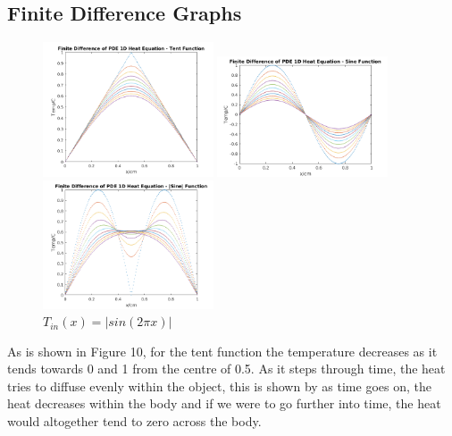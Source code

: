 \documentclass[11pt,a4paper]{article}
\begin{document}
\subsection{Finite Difference Graphs}

\begin{figure}
    \vspace{-13mm}
  		\includegraphics[width=0.45\textwidth]{Ex4_Figs/FiniteTent.png}
	\vspace{-4mm}
  	\caption{$T_{in}(x)= tent(x)$}
  		\includegraphics[width=0.45\textwidth]{Ex4_Figs/FiniteSine.png}
	\vspace{-4mm}
  	\caption{$T_{in}(x)= sin(2{\pi}x)$}
    \includegraphics[width=0.45\textwidth]{Ex4_Figs/FiniteSineabs.png}
    \vspace{-4mm}
    \caption{$T_{in}(x)= |sin(2{\pi}x)|$}
  	\label{fig:ex4g1}
\end{figure}

As is shown in Figure 10, for the tent function the temperature decreases as it tends towards 0 and 1 from the centre of 0.5. As it steps through time, the heat tries to diffuse evenly within the object, this is shown by as time goes on, the heat decreases within the body and if we were to go further into time, the heat would altogether tend to zero across the body.
\end{document}
